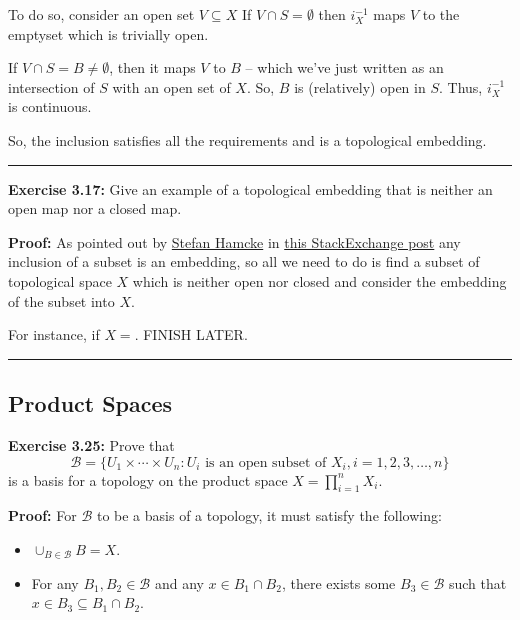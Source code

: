 \documentclass{article}
\begin{document}
\vskip 0.5cm
To do so, consider an open set $V \subseteq X$ If $V \cap S = \emptyset$ then $i_X^{-1}$ maps $V$ to the emptyset which is trivially open.

If $V \cap S = B \neq \emptyset$, then it maps $V$ to $B$ -- which we've just written as an intersection of $S$ with an open set of $X$. So, $B$ is (relatively) open in $S$. Thus, $i_X^{-1}$ is continuous.

\vskip 0.5cm
So, the inclusion satisfies all the requirements and is a topological embedding.

\vskip 0.5cm
\hrule
\vskip 0.5cm

\textbf{Exercise 3.17:} Give an example of a topological embedding that is neither an open map nor a closed map.

\vskip 0.5cm

\textbf{Proof:} As pointed out by \href{https://math.stackexchange.com/users/41672/stefan-hamcke}{Stefan Hamcke} in \href{https://math.stackexchange.com/questions/1288421/topological-embedding-which-is-neither-open-nor-closed}{this StackExchange post} any inclusion of a subset is an embedding, so all we need to do is find a subset of topological space $X$ which is neither open nor closed and consider the embedding of the subset into $X$.

\vskip 0.5cm
For instance, if $X = $. FINISH LATER.

\vskip 0.5cm
\hrule
\vskip 0.5cm

\subsection{Product Spaces}

\textbf{Exercise 3.25:} Prove that 
\[ \mathcal{B} = \{ U_1 \times \cdots \times U_n : U_i \text{ is an open subset of }X_i, i = 1,2,3,\dots,n \} \]
is a basis for a topology on the product space $X = \prod_{i = 1}^{n} X_i$.

\vskip 0.5cm

\textbf{Proof:} For $\mathcal{B}$ to be a basis of a topology, it must satisfy the following: 

\begin{itemize}
  \item $\cup_{B \in \mathcal B} B = X$.
  \item For any $B_1, B_2 \in \mathcal B$ and any $x \in B_1 \cap B_2$, there exists some $B_3 \in \mathcal B$ such that $x \in B_3 \subseteq B_1 \cap B_2$.  
\end{itemize}
\end{document}
